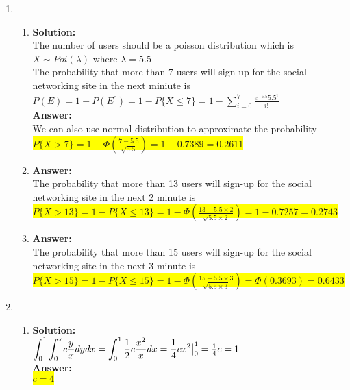 \documentclass{article}
\newcommand{\myansw}{\textbf{Answer:}\\}
\newcommand{\mysolu}{\textbf{Solution:}\\}
\begin{document}
\thispagestyle{fancy} %

\begin{enumerate}
	\item
	\begin{enumerate}
		\item
		\mysolu
		The number of users should be a poisson distribution which is\\
		${X \sim Poi(\lambda)}$ where ${\lambda = 5.5}$\\
		The probability that more than 7 users will sign-up for the social networking site in the next miniute is\\
		${P(E) = 1 - P(E^c) = 1 - P\{X \leq 7\} = 1 - \sum\limits_{i = 0}^7 \frac{e^{-5.5}5.5^i}{i!}}$\\
		\myansw
		We can also use normal distribution to approximate the probability\\
		\colorbox{yellow}{${P\{X > 7\} = 1 - \Phi(\frac{7-5.5}{\sqrt{5.5}}) = 1 - 0.7389 = 0.2611 }$}\\
		
		\item
		\myansw
		The probability that more than 13 users will sign-up for the social networking site in the next 2 minute is\\
		\colorbox{yellow}{${P\{X > 13\} = 1 - P\{X \leq 13\} = 1 - \Phi(\frac{13 - 5.5\times2}{\sqrt{5.5 \times 2}}) = 1 - 0.7257 = 0.2743}$}\\
		
		\item
		\myansw
		The probability that more than 15 users will sign-up for the social networking site in the next 3 minute is\\
		\colorbox{yellow}{${P\{X > 15\} = 1 - P\{X \leq 15\} = 1 - \Phi(\frac{15 - 5.5\times3}{\sqrt{5.5 \times 3}}) = \Phi(0.3693) = 0.6433}$}\\		
		
	\end{enumerate}
	\item 
	\begin{enumerate}
		\item
		\mysolu
		${\mathlarger{\int_{0}^{1}{\int_{0}^{x}}c\frac{y}{x}dydx}=\mathlarger{\int_{0}^{1}\frac{1}{2}c\frac{x^2}{x}dx=\frac{1}{4}cx^2\big|_{0}^{1}}=\frac{1}{4}c=1}$\\
		\myansw
		\colorbox{yellow}{${c = 4}$}\\
		

\end{enumerate}
\end{enumerate}
\end{document}
